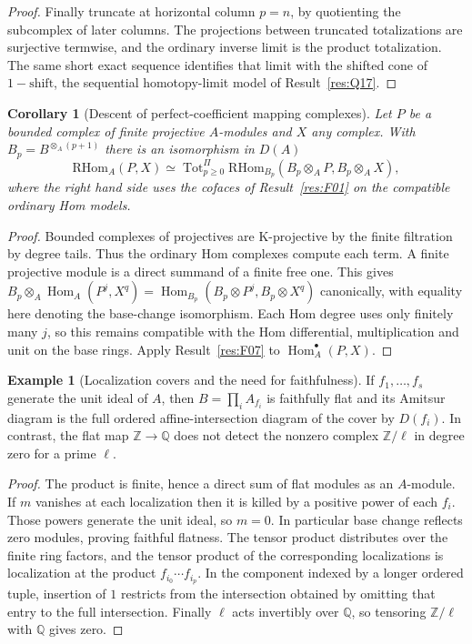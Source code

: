 \documentclass[11pt,oneside,openany]{book}
\newtheorem{corollary}[theorem]{Corollary}
\theoremstyle{definition}
\newtheorem{example}[theorem]{Example}
\theoremstyle{remark}
\begin{document}
\begin{proof}
Finally truncate at horizontal column \(p=n\), by quotienting the
subcomplex of later columns. The projections between truncated
totalizations are surjective termwise, and the ordinary inverse
limit is the product totalization. The same short exact sequence
identifies that limit with the shifted cone of \(1-\mathrm{shift}\),
the sequential homotopy-limit model of Result~\ref{res:Q17}.
\end{proof}

\begin{corollary}[Descent of perfect-coefficient mapping complexes]\label{res:F08}
Let \(P\) be a bounded complex of finite projective \(A\)-modules
and \(X\) any complex. With \(B_p=B^{\otimes_A(p+1)}\) there is an
isomorphism in \(D(A)\)
\[
 \mathrm{RHom}_A(P,X)\simeq
 \operatorname{Tot}^{\Pi}_{p\geq0}
 \mathrm{RHom}_{B_p}(B_p\otimes_A P,B_p\otimes_A X),
\]
where the right hand side uses the cofaces of Result~\ref{res:F01}
on the compatible ordinary Hom models.
\end{corollary}
\begin{proof}
Bounded complexes of projectives are K-projective by the finite
filtration by degree tails. Thus the ordinary Hom complexes
compute each term. A finite projective module is a direct summand
of a finite free one. This gives
\(B_p\otimes_A\operatorname{Hom}_A(P^j,X^q)
=\operatorname{Hom}_{B_p}(B_p\otimes P^j,B_p\otimes X^q)\)
canonically, with equality here denoting the base-change isomorphism.
Each Hom degree uses only finitely many \(j\), so this remains
compatible with the Hom differential, multiplication and unit
on the base rings. Apply Result~\ref{res:F07} to
\(\operatorname{Hom}_A^\bullet(P,X)\).
\end{proof}

\begin{example}[Localization covers and the need for faithfulness]\label{res:F09}
If \(f_1,\ldots,f_s\) generate the unit ideal of \(A\), then
\(B=\prod_i A_{f_i}\) is faithfully flat and its Amitsur diagram
is the full ordered affine-intersection diagram of the cover by
\(D(f_i)\). In contrast, the flat map \(\mathbb Z\to\mathbb Q\)
does not detect the nonzero complex \(\mathbb Z/\ell\) in degree
zero for a prime \(\ell\).
\end{example}
\begin{proof}
The product is finite, hence a direct sum of flat modules as an
\(A\)-module. If \(m\) vanishes at each localization then it is
killed by a positive power of each \(f_i\). Those powers generate
the unit ideal, so \(m=0\). In particular base change reflects
zero modules, proving faithful flatness. The tensor product
distributes over the finite ring factors, and the tensor product
of the corresponding localizations is localization at the
product \(f_{i_0}\cdots f_{i_p}\). In the component indexed by a
longer ordered tuple, insertion of \(1\) restricts from the
intersection obtained by omitting that entry to the full intersection.
Finally \(\ell\) acts invertibly over \(\mathbb Q\), so tensoring
\(\mathbb Z/\ell\) with \(\mathbb Q\) gives zero.
\end{proof}
\end{document}
